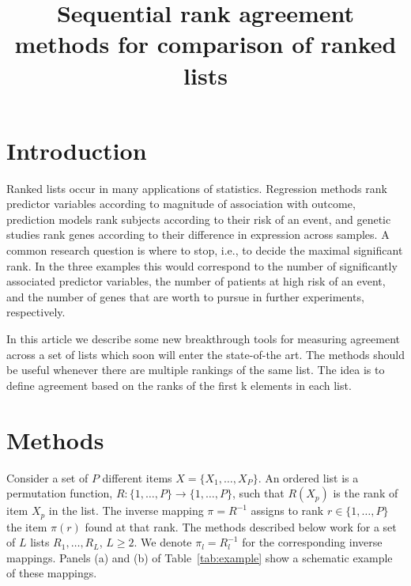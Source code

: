 \documentclass[12pt,a4paper]{article}\usepackage[]{graphicx}\usepackage[]{color}
\begin{document}

\title{Sequential rank agreement methods for comparison of ranked lists}
\author{}

\maketitle

\begin{abstract}

\end{abstract}

\section{Introduction}

Ranked lists occur in many applications of statistics. Regression
methods rank predictor variables according to magnitude of association
with outcome, prediction models rank subjects according to their risk
of an event, and genetic studies rank genes according to their
difference in expression across samples. A common research question is
where to stop, i.e., to decide the maximal significant rank.  In the
three examples this would correspond to the number of significantly
associated predictor variables, the number of patients at high risk of
an event, and the number of genes that are worth to pursue in further
experiments, respectively.

In this article we describe some new breakthrough tools for measuring
agreement across a set of lists which soon will enter the state-of-the
art. The methods should be useful whenever there are multiple rankings
of the same list. The idea is to define agreement based on the ranks
of the first k elements in each list.


\section{Methods}

Consider a set of $P$ different items $X=\{X_1,\dots,X_P\}$. An
ordered list is a permutation function, $R: \{1,\dots,P\}\to
\{1,\dots,P\}$, such that $R(X_p)$ is the rank of item $X_p$ in the
list. The inverse mapping $\pi=R^{-1}$ assigns to rank
$r\in\{1,\dots,P\}$ the item $\pi(r)$ found at that rank. The methods
described below work for a set of $L$ lists $R_1,\dots,R_L$,
$L\geq2$. We denote $\pi_l=R_l^{-1}$ for the corresponding inverse
mappings. Panels (a) and (b) of Table~\ref{tab:example} show a
schematic example of these mappings.
\end{document}
